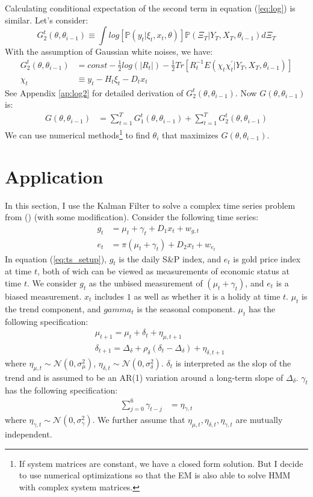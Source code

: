 \documentclass[12pt]{article}
\numberwithin{equation}{section}
\begin{document}
Calculating conditional expectation of the second term in equation (\ref{eq:log}) is similar. Let's consider:
\[
    G_2^t(\theta,\theta_{i-1}) \equiv \int log[\mathbb{P}(y_t|\xi_{t},x_t, \theta)]\mathbb{P}(\Xi_T|Y_T,X_T,\theta_{i-1})d\Xi_T 
\]
With the assumption of Gaussian white noises, we have:
\begin{align}
    G_2^t(\theta,\theta_{i-1}) &= const - \frac{1}{2}log(|R_t|)-\frac{1}{2}Tr[R_t^{-1}E(\chi_t\chi_t^{'}|Y_T,X_T,\theta_{i-1})] \label{eq:log2_trace} \\
    \chi_t &\equiv y_t - H_t\xi_t - D_tx_t \nonumber
\end{align}
See Appendix \ref{ap:log2} for detailed derivation of $G_2^t(\theta,\theta_{i-1})$. Now $G(\theta,\theta_{i-1})$ is:
\begin{align*}
    G(\theta,\theta_{i-1}) &= \sum_{t=1}^{T}G_1^t(\theta,\theta_{i-1}) + \sum_{t=1}^{T}G_2^t(\theta,\theta_{i-1})
\end{align*}
We can use numerical methods\footnote{If system matrices are constant, we have a closed form solution. But I decide to use numerical optimizations so that the EM is also able to solve HMM with complex system matrices.} to find $\theta_i$ that maximizes $G(\theta,\theta_{i-1})$.

\section{Application} \label{sec:apply}
In this section, I use the Kalman Filter to solve a complex time series problem from (\cite{brodersen_etal_2015}) (with some modification). Consider the following time series: 
\begin{align}
    g_t &= \mu_t + \gamma_t + D_1x_t + w_{g,t} \label{eq:ts_setup} \\
    e_t &= \pi(\mu_t + \gamma_t) + D_2x_t + w_{e_t}
\end{align}
In equation (\ref{eq:ts_setup}), $g_t$ is the daily S\&P index, and $e_t$ is gold price index at time $t$, both of wich can be viewed as measurements of economic status at time $t$. We consider $g_t$ as the unbised measurement of $(\mu_t+\gamma_t)$, and $e_t$ is a biased measurement. $x_t$ includes $1$ as well as whether it is a holidy at time $t$. $\mu_t$ is the trend component, and $gamma_t$ is the seasonal component. $\mu_t$ has the following specification:
\begin{align}
    &\mu_{t+1} = \mu_{t} + \delta_t + \eta_{\mu,t+1} \\
    &\delta_{t+1} = \Delta_{\delta} + \rho_{\delta}(\delta_t - \Delta_{\delta}) + \eta_{\delta,t+1} 
\end{align}
where $\eta_{\mu,t}\sim\mathcal{N}(0,\sigma_{\mu}^2)$, $\eta_{\delta,t}\sim\mathcal{N}(0,\sigma_{\delta}^2)$. $\delta_t$ is interpreted as the slop of the trend and is assumed to be an AR(1) variation around a long-term slope of $\Delta_{\delta}$. $\gamma_t$ has the following specification:
\begin{align}
    \sum_{j=0}^6\gamma_{t-j} &= \eta_{\gamma,t}
\end{align}
where $\eta_{\gamma,t}\sim\mathcal{N}(0,\sigma_{\gamma}^2)$. We further assume that $\eta_{\mu,t},\eta_{\delta,t},\eta_{\gamma,t}$ are mutually independent. 
\end{document}
